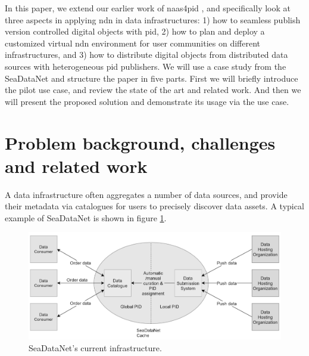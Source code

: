 \documentclass[conference]{IEEEtran}
\begin{document}
In this paper, we extend our earlier work of \gls{naas4pid} \cite{koulouzis2018information}, and specifically look at three aspects in applying \gls{ndn} in data infrastructures: 1) how to seamless publish version controlled digital objects with \gls{pid}, 2) how to plan and deploy a customized virtual \gls{ndn} environment for user communities on different infrastructures, and 3) how to distribute digital objects from distributed data sources with heterogeneous \gls{pid} publishers. We will use a case study from the SeaDataNet and structure the paper in five parts. First we will briefly introduce the pilot use case, and review the state of the art and related work. And then we will present the proposed solution and demonstrate its usage via the use case.




\section{Problem background, challenges and related work}

A data infrastructure often aggregates a number of data sources, and provide their metadata via catalogues for users to precisely discover data assets. A typical example of SeaDataNet is shown in figure \ref{fig:sdc_cur}. 
\begin{figure}[H]
\centering
\includegraphics[width=\columnwidth]{images/SDC_current.png}
\caption{SeaDataNet's current infrastructure.}
\label{fig:sdc_cur}
\end{figure}
\end{document}
